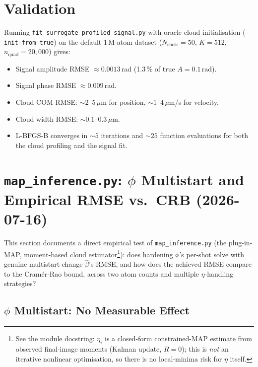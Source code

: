 \documentclass[11pt,a4paper]{article}
\begin{document}
\section{Validation}

Running \texttt{fit\_surrogate\_profiled\_signal.py} with oracle cloud
initialisation (\texttt{--init-from-true}) on the default 1\,M-atom dataset
($N_\mathrm{shots}=50$, $K=512$, $n_\mathrm{quad}=20{,}000$) gives:

\begin{itemize}
  \item Signal amplitude RMSE $\approx 0.0013$\,rad
        (1.3\,\% of true $A=0.1$\,rad).
  \item Signal phase RMSE $\approx 0.009$\,rad.
  \item Cloud COM RMSE: $\sim\!2$--$5$\,$\mu$m for position,
        $\sim\!1$--$4$\,$\mu$m/s for velocity.
  \item Cloud width RMSE: $\sim\!0.1$--$0.3$\,$\mu$m.
  \item L-BFGS-B converges in $\sim\!5$ iterations and $\sim\!25$ function
        evaluations for both the cloud profiling and the signal fit.
\end{itemize}

\section{\texttt{map\_inference.py}: $\phi$ Multistart and Empirical RMSE
vs.\ CRB (2026-07-16)}
\label{sec:map_inference_rmse}

This section documents a direct empirical test of \texttt{map\_inference.py}
(the plug-in-MAP, moment-based cloud estimator\footnote{See
the module docstring: $\eta_i$ is a closed-form constrained-MAP estimate from
observed final-image moments (Kalman update, $R=0$); this is \emph{not} an
iterative nonlinear optimisation, so there is no local-minima risk for
$\eta$ itself.}): does hardening $\phi$'s per-shot solve with genuine
multistart change $\hat\beta$'s RMSE, and how does the achieved RMSE compare
to the Cram\'er-Rao bound, across two atom counts and multiple $\eta$-handling
strategies?

\subsection{$\phi$ Multistart: No Measurable Effect}
\end{document}
